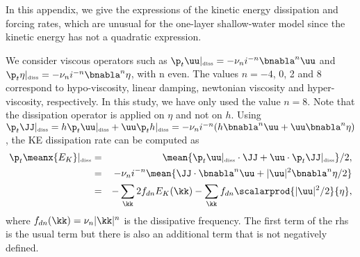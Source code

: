

In this appendix, we give the expressions of the kinetic energy
dissipation and forcing rates, which are unusual for the one-layer
shallow-water model since the kinetic energy has not a quadratic
expression.


We consider viscous operators such as $\p_t \uu |_{\mbox{\tiny diss}}
=- \nu_n i^{-n} \bnabla^n \uu $ and $\p_t \eta |_{\mbox{\tiny diss}}
=- \nu_n i^{-n} \bnabla^n \eta $, with n even.  The values $n=-4$, 0,
2 and 8 correspond to hypo-viscosity, linear damping, newtonian
viscosity and hyper-viscosity, respectively.  In this study, we have
only used the value $n=8$.
%
Note that the dissipation operator is applied on $\eta$ and not on
$h$.  Using $\p_t \JJ |_{\mbox{\tiny diss}} = h \p_t \uu
|_{\mbox{\tiny diss}} + \uu \p_t h |_{\mbox{\tiny diss}} = - \nu_n
i^{-n} (h \bnabla^n \uu + \uu \bnabla^n \eta )$, the KE dissipation
rate can be computed as
\begin{eqnarray}
\p_t \meanx{E_K} |_{\mbox{\tiny diss}} 
&=& 
\mean{
\p_t \uu |_{\mbox{\tiny diss}} \cdot \JJ
+ \uu \cdot \p_t \JJ |_{\mbox{\tiny diss}}
} /2, \\
&=& 
- \nu_n i^{-n}
\mean{
\JJ \cdot \bnabla^n \uu + |\uu|^2 \bnabla^n \eta /2
} \\
&=& 
- \sum_\kk 2 f_{dn}  E_K(\kk)
- \sum_\kk  f_{dn} \scalarprod{|\uu|^2/2}{\eta},
\end{eqnarray}
where $ f_{dn} (\kk) = \nu_n |\kk|^n$ is the dissipative frequency.
The first term of the rhs is the usual term but there is also an
additional term that is not negatively defined.




